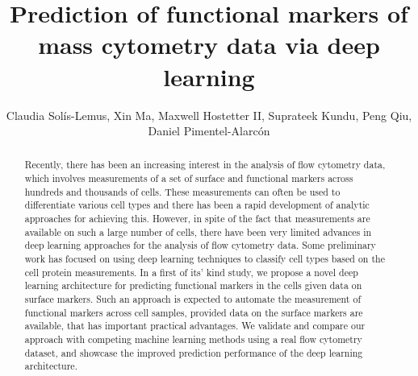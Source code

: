 \documentclass[conference]{IEEEtran}
\makeatletter
\newcounter{@inst}
\def\institute#1{\gdef\@institute{#1}}
\makeatother
\begin{document}
\title{Prediction of functional markers of mass cytometry data via
  deep learning}
\author{Claudia Sol\'is-Lemus, Xin Ma, Maxwell Hostetter II, Suprateek
  Kundu, Peng Qiu, Daniel Pimentel-Alarc\'on}
\institute{Claudia Sol\'is-Lemus \at Emory University, Atlanta, GA, \email{csolisl@emory.edu}
\and Xin Ma \at Emory University, Atlanta, GA,
\email{xin.ma@emory.edu}
\and Maxwell Hostetter II \at Georgia State University, Atlanta, GA,
\email{mhostetter1@student.gsu.edu}
\and Suprateek Kundu \at Emory University, Atlanta, GA,
\email{suprateek.kundu@emory.edu}
\and Peng Qiu \at Georgia Institute of Technology and Emory University, Atlanta, GA,
\email{peng.qiu@bme.gatech.edu}
\and Daniel Pimentel-Alarc\'on \at Georgia State University, Atlanta, GA,
\email{pimentel@gsu.edu}}
%
%
\maketitle

\begin{abstract}
Recently, there has been an increasing interest in the analysis of
flow cytometry data, which involves measurements of a set of surface
and functional markers across hundreds and thousands of cells. These
measurements can often be used to differentiate various cell types and
there has been a rapid development of analytic approaches for
achieving this. However, in spite of the fact that measurements are
available on such a large number of cells, there have been very
limited advances in deep learning approaches for the analysis of flow
cytometry data. Some preliminary work has focused on using deep
learning techniques to classify cell types based on the cell protein
measurements. In a first of its' kind study, we propose a novel deep
learning architecture for predicting functional markers in the cells
given data on surface markers. Such an approach is expected to
automate the measurement of functional markers across cell samples,
provided data on the surface markers are available, that has important
practical advantages. We validate and compare our approach with
competing machine learning methods using a real flow cytometry
dataset, and showcase the improved prediction performance of the deep
learning architecture.
\end{abstract}
\end{document}
